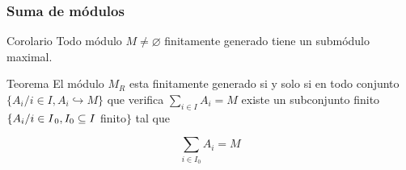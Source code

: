\documentclass[notes=show]{beamer}%
\newenvironment{Corol}{\begin{block}{Corolario}}{\end{block}}
\newenvironment{Teo}{\begin{block}{Teorema}}{\end{block}}
\begin{document}
\bigskip%

\begin{frame}%


\bigskip%
\frametitle{Suma de módulos}%


\begin{Corol}
Todo módulo $M\neq\varnothing$ finitamente generado tiene un submódulo maximal.
\end{Corol}

\begin{Teo}
El módulo $M_{R}$ esta finitamente generado si y solo si en todo conjunto
$\{A_{i}/i\in I,A_{i}\hookrightarrow M\}$ que verifica $%
{\displaystyle\sum\limits_{i\in I}}
A_{i}=M$ existe un subconjunto finito $\{A_{i}/i\in I_{\text{\thinspace}%
0},I_{0}\subseteq I$ finito$\}$ tal que%

\[%
{\displaystyle\sum\limits_{i\in I_{0}}}
A_{i}=M
\]

\end{Teo}

%

\transboxout
\end{frame}%


\bigskip%
\end{document}
